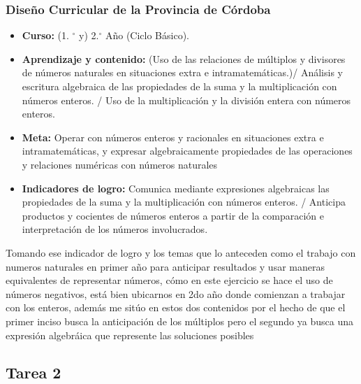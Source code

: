 \documentclass[11pt,a4paper]{article}
\begin{document}
\subsubsection{Diseño Curricular de la Provincia de Córdoba}
\begin{itemize}
    \item \textbf{Curso:} (1. $^{\circ}$ y) 2.$^{\circ}$ Año (Ciclo Básico).
    \item \textbf{Aprendizaje y contenido:} (Uso de las relaciones de múltiplos y divisores de números naturales en situaciones extra e intramatemáticas.)/ Análisis y escritura algebraica de las propiedades de la suma y la multiplicación con números enteros. / Uso de la multiplicación y la división entera con números enteros.
    \item \textbf{Meta:} Operar con números enteros y racionales en situaciones extra e intramatemáticas, y expresar algebraicamente propiedades de las operaciones y relaciones numéricas con números naturales
    \item \textbf{Indicadores de logro:} Comunica mediante expresiones algebraicas las propiedades de la suma y la multiplicación con números enteros. / Anticipa productos y cocientes de números enteros a partir de la comparación e interpretación de los números involucrados.
\end{itemize}
Tomando ese indicador de logro y los temas que lo anteceden como el trabajo con numeros naturales en primer año para anticipar resultados y usar maneras equivalentes de representar números, cómo en este ejercicio se hace el uso de números negativos, está bien ubicarnos en 2do año donde comienzan a trabajar con los enteros, además me sitúo en estos dos contenidos por el hecho de que el primer inciso busca la anticipación de los múltiplos pero el segundo ya busca una expresión algebráica que represente las soluciones posibles
\subsection{Tarea 2}
\end{document}
